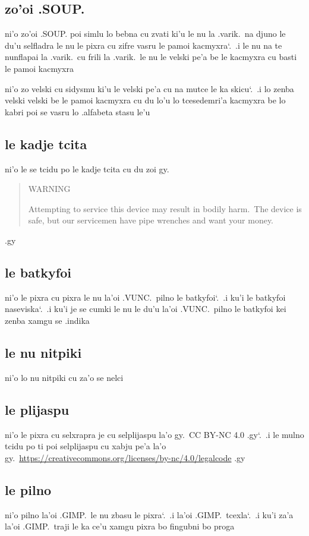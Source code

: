 \documentclass{report}
\newcommand\sds{\spacefactor\sfcode`.\ \space}
\begin{document}
\subsection{zo'oi .SOUP.}
ni'o zo'oi .SOUP. poi simlu lo bebna cu zvati ki'u le nu la .varik.\ na djuno le du'u selfladra le nu le pixra cu zifre vasru le pamoi kacmyxra\sds  .i le nu na te nunflapai la .varik.\ cu frili la .varik.\ le nu le velski pe'a be le kacmyxra cu basti le pamoi kacmyxra

ni'o zo velski cu sidysmu ki'u le velski pe'a cu na mutce le ka skicu\sds  .i lo zenba velski velski be le pamoi kacmyxra cu du lo'u lo tcesedemri'a kacmyxra be lo kabri poi se vasru lo .alfabeta stasu le'u

\subsection{le kadje tcita}
ni'o le se tcidu po le kadje tcita cu du zoi gy.
\begin{quote}
	WARNING

	Attempting to service this device may result in bodily harm.\  The device is safe, but our servicemen have pipe wrenches and want your money.
\end{quote}
.gy

\subsection{le batkyfoi}
ni'o le pixra cu pixra le nu la'oi .VUNC.\ pilno le batkyfoi\sds  .i ku'i le batkyfoi naseviska\sds  .i ku'i je se cumki le nu le du'u la'oi .VUNC.\ pilno le batkyfoi kei zenba xamgu se .indika

\subsection{le nu nitpiki}
ni'o lo nu nitpiki cu za'o se nelci

\subsection{le plijaspu}
ni'o le pixra cu selxrapra je cu selplijaspu la'o gy.\ CC BY-NC 4.0 .gy\sds .i le mulno tcidu po ti poi selplijaspu cu xabju pe'a la'o gy.\ \url{https://creativecommons.org/licenses/by-nc/4.0/legalcode} .gy

\subsection{le pilno}
ni'o pilno la'oi .GIMP.\ le nu zbasu le pixra\sds  .i la'oi .GIMP.\ tcexla\sds  .i ku'i za'a la'oi .GIMP.\ traji le ka ce'u xamgu pixra bo fingubni bo proga
\end{document}
